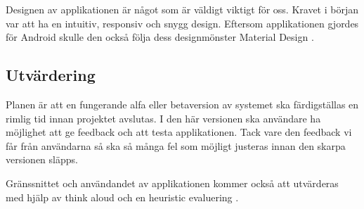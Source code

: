 \documentclass[a4paper, 11pt]{article}
\begin{document}
Designen av applikationen är något som är väldigt viktigt för oss. Kravet i början var att ha en intuitiv, responsiv och snygg design. Eftersom applikationen gjordes för Android skulle den också följa dess designmönster Material Design \cite{MaterialDesign}.

\subsection{Utvärdering}
Planen är att en fungerande alfa eller betaversion av systemet ska färdigställas en rimlig tid innan projektet avslutas. I den här versionen ska användare ha möjlighet att ge feedback och att testa applikationen. Tack vare den feedback vi får från användarna så ska så många fel som möjligt justeras innan den skarpa versionen släpps.

Gränssnittet och användandet av applikationen kommer också att utvärderas med hjälp av think aloud \cite{thinkaloud} och en heuristic evaluering \cite{heruistic}.

\newpage
\printbibliography[title={Referenser}]
\end{document}
